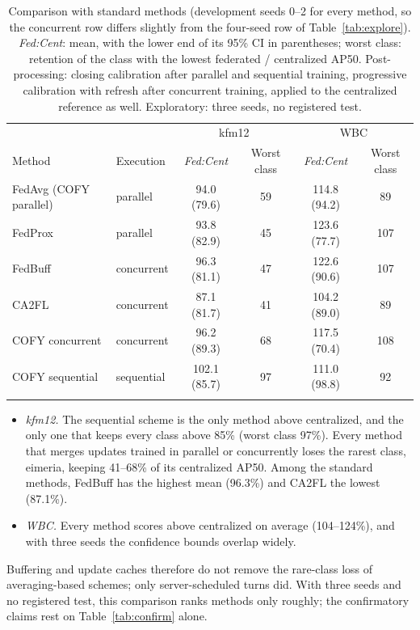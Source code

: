 \documentclass[pdflatex,sn-mathphys-num]{sn-jnl}
\newcommand{\sys}{COFY}
\newcommand{\fedcent}{\textit{Fed:Cent}}
\begin{document}
\begin{table}[t]
\caption{Comparison with standard methods (development seeds 0--2 for every method, so the concurrent row differs slightly from the four-seed row of Table~\ref{tab:explore}). \fedcent{}: mean, with the lower end of its 95\% CI in parentheses; worst class: retention of the class with the lowest federated / centralized AP50. Post-processing: closing calibration after parallel and sequential training, progressive calibration with refresh after concurrent training, applied to the centralized reference as well. Exploratory: three seeds, no registered test.}\label{tab:baselines}
\footnotesize
\begin{tabular*}{\textwidth}{@{\extracolsep\fill}llcccc}
\toprule
 & & \multicolumn{2}{c}{kfm12} & \multicolumn{2}{c}{WBC} \\
Method & Execution & \fedcent{} & Worst class & \fedcent{} & Worst class \\
\midrule
FedAvg (\sys{} parallel) & parallel & 94.0 (79.6) & 59 & 114.8 (94.2) & 89 \\
FedProx & parallel & 93.8 (82.9) & 45 & 123.6 (77.7) & 107 \\
FedBuff & concurrent & 96.3 (81.1) & 47 & 122.6 (90.6) & 107 \\
CA2FL & concurrent & 87.1 (81.7) & 41 & 104.2 (89.0) & 89 \\
\sys{} concurrent & concurrent & 96.2 (89.3) & 68 & 117.5 (70.4) & 108 \\
\sys{} sequential & sequential & 102.1 (85.7) & 97 & 111.0 (98.8) & 92 \\
\botrule
\end{tabular*}
\end{table}

\begin{itemize}
\item \emph{kfm12.} The sequential scheme is the only method above centralized, and the only one that keeps every class above 85\% (worst class 97\%). Every method that merges updates trained in parallel or concurrently loses the rarest class, eimeria, keeping 41--68\% of its centralized AP50. Among the standard methods, FedBuff has the highest mean (96.3\%) and CA2FL the lowest (87.1\%).
\item \emph{WBC.} Every method scores above centralized on average (104--124\%), and with three seeds the confidence bounds overlap widely.
\end{itemize}
Buffering and update caches therefore do not remove the rare-class loss of averaging-based schemes; only server-scheduled turns did. With three seeds and no registered test, this comparison ranks methods only roughly; the confirmatory claims rest on Table~\ref{tab:confirm} alone.
\end{document}
